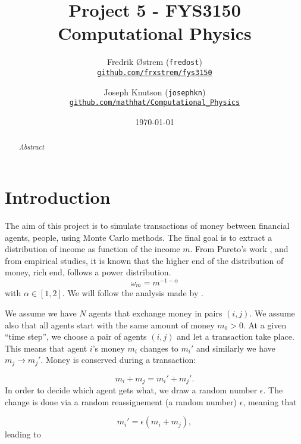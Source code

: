 \documentclass[12pt,a4paper]{article}
\begin{document}
\title{Project 5 - FYS3150 Computational Physics}
\author{
  Fredrik Østrem (\texttt{fredost}) \\
    \href{https://github.com/frxstrem/fys3150/tree/master/project5}{\tt github.com/frxstrem/fys3150}
  \and
  Joseph Knutson (\texttt{josephkn}) \\
    \href{https://github.com/mathhat/Computational_Physics/tree/master/prosjekt5}{\tt github.com/mathhat/Computational\_Physics}
}
\date{\today}

\maketitle

\begin{abstract}
  \textit{Abstract}
\end{abstract}

\tableofcontents

\clearpage

\section{Introduction}
The aim of this project is to simulate transactions of money between financial
agents, people, using Monte Carlo methods. The final goal is to extract a distribution of
income as function of the income $m$. From Pareto’s work
\autocite{pareto},
and from empirical studies, it is known that the higher end of the distribution of money, rich end, follows a power distribution.
$$\omega_{m} = m^{-1-\alpha} $$
with $\alpha\in [1,2]$. We will follow the analysis made by
\textcite{patriarca}.

We assume we have $N$ agents that exchange money in pairs $(i,j)$. We assume also that all agents
start with the same amount of money $m_0 > 0$. At a given ``time step'', we choose a pair
of agents $(i,j)$ and let a transaction take place. This means that agent $i$'s money $m_i$ changes
to $m_i'$ and similarly we have $m_j\rightarrow m_j'$.
Money is conserved during a transaction:

\begin{equation}
  m_i+m_j=m_i'+m_j'.
  \label{eq:conserve}
\end{equation}
In order to decide which agent gets what, we draw a random number $\epsilon$.
The change is done via a random reassignement (a random number) $\epsilon$, meaning that

\begin{equation}
  m_i' = \epsilon(m_i+m_j), \label{eq:eps1}
\end{equation}
leading to
\end{document}
